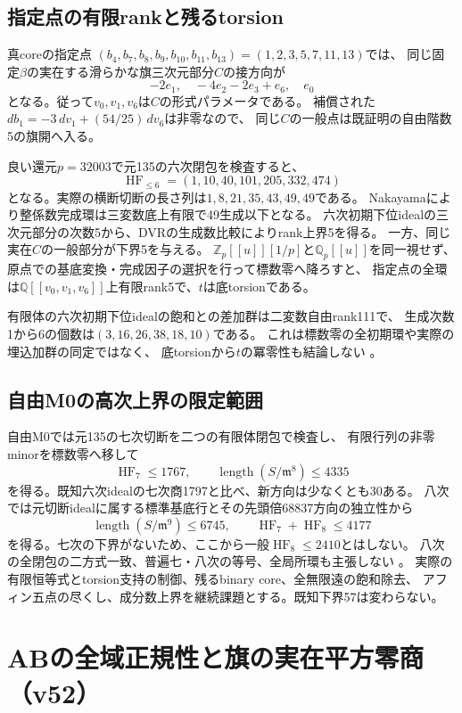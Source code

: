 \documentclass[11pt,a4paper]{ltjsarticle}
\theoremstyle{remark}
\begin{document}
\subsection{指定点の有限rankと残るtorsion}
真coreの指定点
$(b_4,b_7,b_8,b_9,b_{10},b_{11},b_{13})=(1,2,3,5,7,11,13)$では、
同じ固定$\beta$の実在する滑らかな旗三次元部分$C$の接方向が
\[
 -2e_1,\quad -4e_2-2e_3+e_6,\quad e_0
\]
となる。従って$v_0,v_1,v_6$は$C$の形式パラメータである。
補償された$db_1=-3\,dv_1+(54/25)\,dv_6$は非零なので、
同じ$C$の一般点は既証明の自由階数5の旗開へ入る。

良い還元$p=32003$で元135の六次閉包を検査すると、
\[
 \operatorname{HF}_{\le6}=(1,10,40,101,205,332,474)
\]
となる。実際の横断切断の長さ列は$1,8,21,35,43,49,49$である。
Nakayamaにより整係数完成環は三変数底上有限で49生成以下となる。
六次初期下位idealの三次元部分の次数5から、DVRの生成数比較によりrank上界5を得る。
一方、同じ実在$C$の一般部分が下界5を与える。
$\mathbb Z_p[[u]][1/p]$と$\mathbb Q_p[[u]]$を同一視せず、
原点での基底変換・完成因子の選択を行って標数零へ降ろすと、
指定点の全環は$\mathbb Q[[v_0,v_1,v_6]]$上有限rank5で、$t$は底torsionである。

有限体の六次初期下位idealの飽和との差加群は二変数自由rank111で、
生成次数1から6の個数は$(3,16,26,38,18,10)$である。
これは標数零の全初期環や実際の埋込加群の同定ではなく、
底torsionから$t$の冪零性も結論しない
\cite{flag-true-rank-v51}。

\subsection{自由M0の高次上界の限定範囲}
自由M0では元135の七次切断を二つの有限体閉包で検査し、
有限行列の非零minorを標数零へ移して
\[
 \operatorname{HF}_7\le1767,\qquad
 \operatorname{length}(S/\mathfrak m^8)\le4335
\]
を得る。既知六次idealの七次商1797と比べ、新方向は少なくとも30ある。
八次では元切断idealに属する標準基底行とその先頭倍68837方向の独立性から
\[
 \operatorname{length}(S/\mathfrak m^9)\le6745,\qquad
 \operatorname{HF}_7+\operatorname{HF}_8\le4177
\]
を得る。七次の下界がないため、ここから一般$\operatorname{HF}_8\le2410$とはしない。
八次の全閉包の二方式一致、普遍七・八次の等号、全局所環も主張しない
\cite{free-seven-v51,free-eight-v51}。
実際の有限恒等式とtorsion支持の制御、残るbinary core、全無限遠の飽和除去、
アフィン五点の尽くし、成分数上界を継続課題とする。既知下界57は変わらない。

\section{ABの全域正規性と旗の実在平方零商（v52）}
\label{sec:v52}
\end{document}
